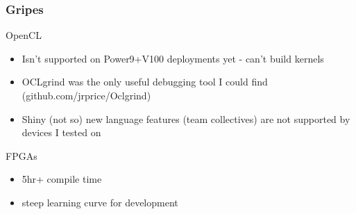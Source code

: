 \documentclass{beamer}
\begin{document}
\begin{frame}
  \frametitle{Gripes}
  OpenCL 
  \begin{itemize}
    \item Isn't supported on Power9+V100 deployments yet - can't build kernels
    \item OCLgrind was the only useful debugging tool I could find (github.com/jrprice/Oclgrind)
    \item Shiny (not so) new language features (team collectives) are not supported by devices I tested on
  \end{itemize}
  FPGAs
  \begin{itemize}
    \item 5hr+ compile time
    \item steep learning curve for development
  \end{itemize}
\end{frame}
\end{document}
